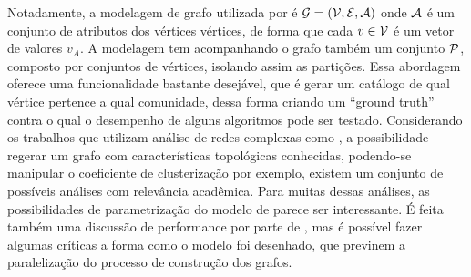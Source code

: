 \documentclass[notes.tex]{subfiles}
\begin{document}
Notadamente, a modelagem de grafo utilizada por  é $\operatorname{\mathcal{G}} = (\operatorname{\mathcal{V}}, \operatorname{\mathcal{E}}, \operatorname{\mathcal{A}})$ onde  $\operatorname{\mathcal{A}}$ é um conjunto de atributos dos vértices vértices, de forma que cada $v \in \operatorname{\mathcal{V}}$ é um vetor de valores  $v_A$.
A modelagem tem acompanhando o grafo também um conjunto $\operatorname{\mathcal{P}}$, composto por conjuntos de vértices, isolando assim as partições.
Essa abordagem oferece uma funcionalidade bastante desejável, que é gerar um catálogo de qual vértice pertence a qual comunidade, dessa forma criando um ``ground truth'' contra o qual o desempenho de alguns algoritmos pode ser testado.
Considerando os trabalhos que utilizam análise de redes complexas como , a possibilidade regerar um grafo com características topológicas conhecidas, podendo-se manipular o coeficiente de clusterização por exemplo, existem um conjunto de possíveis análises com relevância acadêmica.
Para muitas dessas análises, as possibilidades de parametrização do modelo de  parece ser interessante.
É feita também uma discussão de performance por parte de , mas é possível fazer algumas críticas a forma como o modelo foi desenhado, que previnem a paralelização do processo de construção dos grafos.
\end{document}
